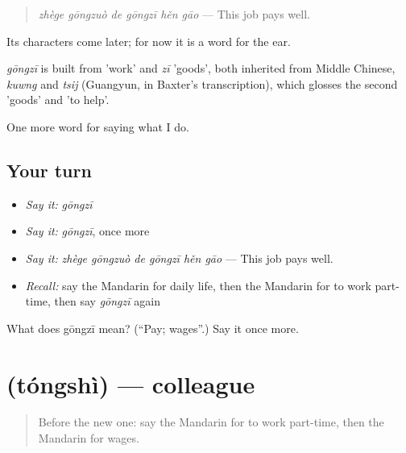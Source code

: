 \begin{quote}
\emph{zhège gōngzuò de gōngzī hěn gāo} — This job pays well.
\end{quote}

Its characters come later; for now it is a word for the ear.

\begin{cousinweb}
\emph{gōngzī} is built from  'work' and \emph{zī} 'goods', both inherited from Middle Chinese, \emph{kuwng} and \emph{tsij} (Guangyun, in Baxter's transcription), which glosses the second 'goods' and 'to help'.
\end{cousinweb}

\begin{grammarlens}[title={What you've built}]
One more word for saying what I do.
\end{grammarlens}

\subsection*{Your turn}
\begin{itemize}
\raggedright
  \item \emph{Say it:} \emph{gōngzī}
  \item \emph{Say it:} \emph{gōngzī}, once more
  \item \emph{Say it:} \emph{zhège gōngzuò de gōngzī hěn gāo} — This job pays well.
  \item \emph{Recall:} say the Mandarin for daily life, then the Mandarin for to work part-time, then say \emph{gōngzī} again
\end{itemize}

\begin{tcolorbox}[breakable,colback=teal!4,colframe=teal!35!black,title={Before you move on}]
What does gōngzī mean? (\textquotedblleft{}Pay; wages\textquotedblright{}.) Say it once more.
\end{tcolorbox}
\section[\texorpdfstring{\zh{同事} (tóngshì)}{同事 (tóngshì)}]{ (tóngshì) — colleague}

\label{lesson:ZH-C255-tongshi}



\begin{quote}
Before the new one: say the Mandarin for to work part-time, then the Mandarin for wages.
\end{quote}

